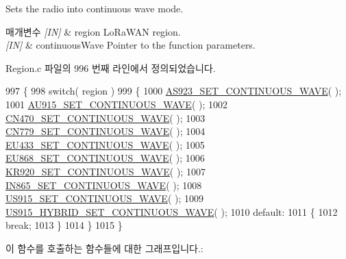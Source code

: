 Sets the radio into continuous wave mode. 


\begin{DoxyParams}{매개변수}
{\em \mbox{[}\+I\+N\mbox{]}} & region Lo\+Ra\+W\+AN region.\\
\hline
{\em \mbox{[}\+I\+N\mbox{]}} & continuous\+Wave Pointer to the function parameters. \\
\hline
\end{DoxyParams}


Region.\+c 파일의 996 번째 라인에서 정의되었습니다.


\begin{DoxyCode}
997 \{
998     \textcolor{keywordflow}{switch}( region )
999     \{
1000         \mbox{\hyperlink{_region_8c_a71a399c13093b5c11886cc051f4b30cb}{AS923\_SET\_CONTINUOUS\_WAVE}}( );
1001         \mbox{\hyperlink{_region_8c_aa07dbb2e5c7eb32553a116e8fc23dc4a}{AU915\_SET\_CONTINUOUS\_WAVE}}( );
1002         \mbox{\hyperlink{_region_8c_a74d3d97314de8e2b1eb9879c29dd5f3f}{CN470\_SET\_CONTINUOUS\_WAVE}}( );
1003         \mbox{\hyperlink{_region_8c_af0cd48e0631611265f7cebb45bb3954b}{CN779\_SET\_CONTINUOUS\_WAVE}}( );
1004         \mbox{\hyperlink{_region_8c_a69d826d96191caf0480fd056efd3190f}{EU433\_SET\_CONTINUOUS\_WAVE}}( );
1005         \mbox{\hyperlink{_region_8c_a97df2998776f274849ccbda3fb7bfebe}{EU868\_SET\_CONTINUOUS\_WAVE}}( );
1006         \mbox{\hyperlink{_region_8c_a3747c721ae612f314d6dce7b25e52568}{KR920\_SET\_CONTINUOUS\_WAVE}}( );
1007         \mbox{\hyperlink{_region_8c_a0d7761ae9e1d8492be94547d5f872a30}{IN865\_SET\_CONTINUOUS\_WAVE}}( );
1008         \mbox{\hyperlink{_region_8c_a6fc55f98313266f4ae61ea83cc7bbedf}{US915\_SET\_CONTINUOUS\_WAVE}}( );
1009         \mbox{\hyperlink{_region_8c_a0750d80b84147ed128c9634262d73ef2}{US915\_HYBRID\_SET\_CONTINUOUS\_WAVE}}( );
1010         \textcolor{keywordflow}{default}:
1011         \{
1012             \textcolor{keywordflow}{break};
1013         \}
1014     \}
1015 \}
\end{DoxyCode}
이 함수를 호출하는 함수들에 대한 그래프입니다.\+:
\mbox{\label{group___r_e_g_i_o_n_ga9a4b01301e0f6f6880dc6a651c062ad0}} 
